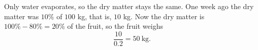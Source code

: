 Only water evaporates, so the dry matter stays the same. One week ago the dry matter was $10\%$ of $100$ kg, that is, $10$ kg. Now the dry matter is $100\%-80\%=20\%$ of the fruit, so the fruit weighs
\[
\dfrac{10}{0.2}=\boxed{50}\ \text{kg}.
\]
